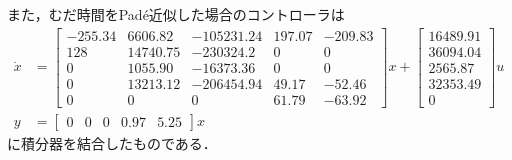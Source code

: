 また，むだ時間をPad\'e近似した場合のコントローラは
\begin{align}
    \dot{x} & =
    \begin{bmatrix}
        -255.34&6606.82&-105231.24&197.07&-209.83\\
        128&14740.75&-230324.2&0&0\\
        0&1055.90&-16373.36&0&0\\
        0&13213.12&-206454.94&49.17&-52.46\\
        0&0&0&61.79&-63.92
    \end{bmatrix}
    x+
    \begin{bmatrix}
    16489.91\\36094.04\\2565.87\\32353.49\\0
    \end{bmatrix}
    u           \\
    y       & =
    \begin{bmatrix}
    0&0&0&0.97&5.25
    \end{bmatrix}
    x
\end{align}
に積分器を結合したものである．